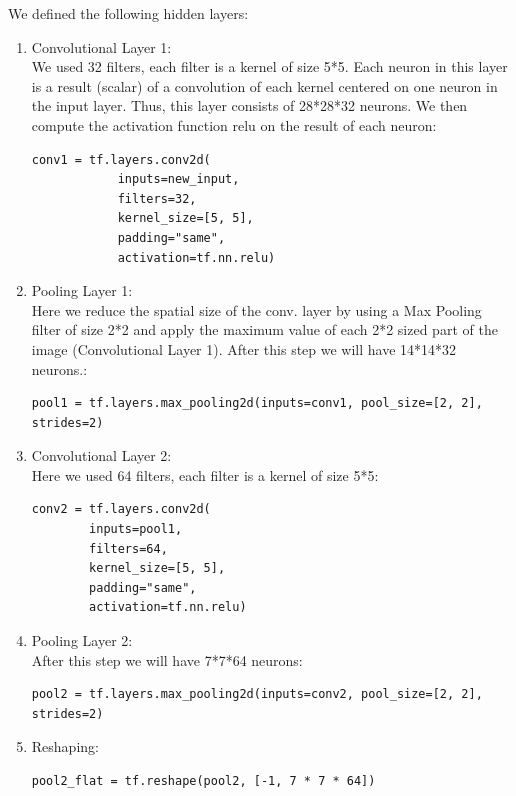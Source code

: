 \documentclass[12pt]{article}
\begin{document}
We defined the following hidden layers:
\begin{enumerate}

\item
Convolutional Layer 1:\\
We used 32 filters, each filter is a kernel of size 5*5. Each neuron in this layer is a result (scalar) of a convolution of each kernel centered on one neuron in the input layer. Thus, this layer consists of 28*28*32 neurons.
We then compute the activation function relu on the result of each neuron:
\begin{lstlisting}[style=PyStyle]
    conv1 = tf.layers.conv2d(
            inputs=new_input,
            filters=32,
            kernel_size=[5, 5],
            padding="same",
            activation=tf.nn.relu)
\end{lstlisting}

\item
Pooling Layer 1:\\
Here we reduce	 the spatial size of the conv. layer by using a Max Pooling filter of size 2*2 and apply the maximum value of each 2*2 sized part of the image (Convolutional Layer 1). After this step we will have 14*14*32 neurons.: 

\begin{lstlisting}[style=PyStyle]
pool1 = tf.layers.max_pooling2d(inputs=conv1, pool_size=[2, 2], strides=2)
\end{lstlisting}

\item
Convolutional Layer 2:\\
Here we used 64 filters, each filter is a kernel of size 5*5:
\begin{lstlisting}[style=PyStyle]
  conv2 = tf.layers.conv2d(
        inputs=pool1,
        filters=64,
        kernel_size=[5, 5],
        padding="same",
        activation=tf.nn.relu)
\end{lstlisting}

\item
Pooling Layer 2:\\
After this step we will have 7*7*64 neurons:
\begin{lstlisting}[style=PyStyle]
      pool2 = tf.layers.max_pooling2d(inputs=conv2, pool_size=[2, 2], strides=2)
\end{lstlisting}

\item
Reshaping:
\begin{lstlisting}[style=PyStyle]
         pool2_flat = tf.reshape(pool2, [-1, 7 * 7 * 64])
\end{lstlisting}


\end{enumerate}
\end{document}
